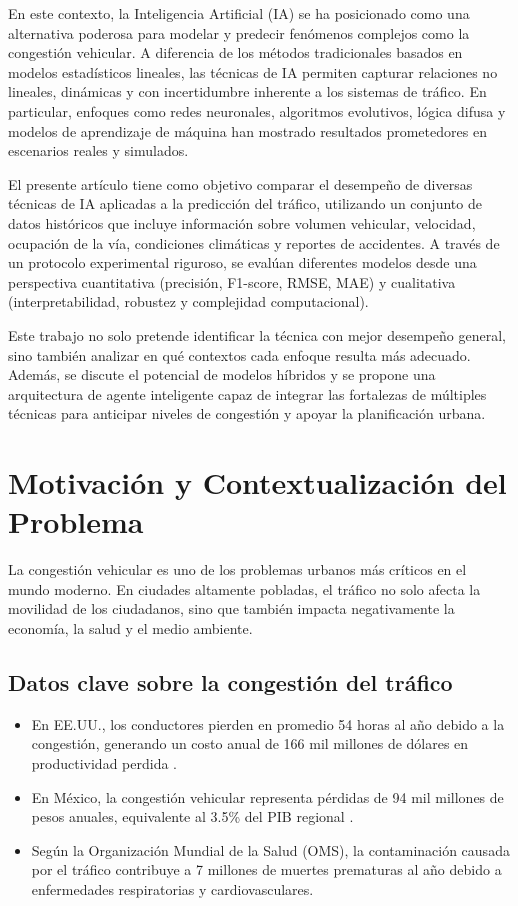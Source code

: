 \documentclass{svproc} %
\begin{document}
En este contexto, la Inteligencia Artificial (IA) se ha posicionado como una alternativa poderosa para modelar y predecir fenómenos complejos como la congestión vehicular. A diferencia de los métodos tradicionales basados en modelos estadísticos lineales, las técnicas de IA permiten capturar relaciones no lineales, dinámicas y con incertidumbre inherente a los sistemas de tráfico. En particular, enfoques como redes neuronales, algoritmos evolutivos, lógica difusa y modelos de aprendizaje de máquina han mostrado resultados prometedores en escenarios reales y simulados.

El presente artículo tiene como objetivo comparar el desempeño de diversas técnicas de IA aplicadas a la predicción del tráfico, utilizando un conjunto de datos históricos que incluye información sobre volumen vehicular, velocidad, ocupación de la vía, condiciones climáticas y reportes de accidentes. A través de un protocolo experimental riguroso, se evalúan diferentes modelos desde una perspectiva cuantitativa (precisión, F1-score, RMSE, MAE) y cualitativa (interpretabilidad, robustez y complejidad computacional).

Este trabajo no solo pretende identificar la técnica con mejor desempeño general, sino también analizar en qué contextos cada enfoque resulta más adecuado. Además, se discute el potencial de modelos híbridos y se propone una arquitectura de agente inteligente capaz de integrar las fortalezas de múltiples técnicas para anticipar niveles de congestión y apoyar la planificación urbana.

\section{Motivación y Contextualización del Problema}
La congestión vehicular es uno de los problemas urbanos más críticos en el mundo
moderno. En ciudades altamente pobladas, el tráfico no solo afecta la movilidad de los
ciudadanos, sino que también impacta negativamente la economía, la salud y el medio
ambiente.

\subsection{Datos clave sobre la congestión del tráfico}
\begin{itemize}
    \item En EE.UU., los conductores pierden en promedio 54 horas al año debido a la
    congestión, generando un costo anual de 166 mil millones de dólares en
    productividad perdida \cite{CEPAL}.
    \item En México, la congestión vehicular representa pérdidas de 94 mil millones de
    pesos anuales, equivalente al 3.5\% del PIB regional \cite{IMCO}.
    \item Según la Organización Mundial de la Salud (OMS), la contaminación causada por
    el tráfico contribuye a 7 millones de muertes prematuras al año debido a
    enfermedades respiratorias y cardiovasculares.
\end{itemize}
\end{document}
